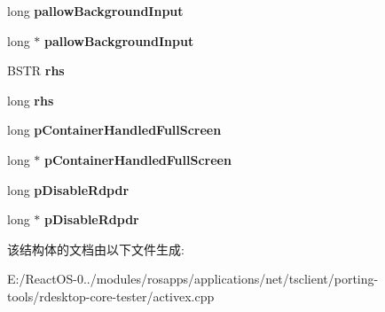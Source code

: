 \begin{DoxyCompactItemize}
long {\bfseries pallow\+Background\+Input}
\item 
\mbox{\label{struct_m_s_t_s_c_lib_1_1_i_ms_tsc_advanced_settings_vtbl_a68d5b0276f4032cbc76793381174ae74}} 
long $\ast$ {\bfseries pallow\+Background\+Input}
\item 
\mbox{\label{struct_m_s_t_s_c_lib_1_1_i_ms_tsc_advanced_settings_vtbl_af50725496eeb79b00284f85da2e7f422}} 
B\+S\+TR {\bfseries rhs}
\item 
\mbox{\label{struct_m_s_t_s_c_lib_1_1_i_ms_tsc_advanced_settings_vtbl_a4514f46936b894fea9758884e503f265}} 
long {\bfseries rhs}
\item 
\mbox{\label{struct_m_s_t_s_c_lib_1_1_i_ms_tsc_advanced_settings_vtbl_a2363cfdc3b819ee7ef66b5ba2632bba5}} 
long {\bfseries p\+Container\+Handled\+Full\+Screen}
\item 
\mbox{\label{struct_m_s_t_s_c_lib_1_1_i_ms_tsc_advanced_settings_vtbl_a430452503b0617b3654bffa58dcfa415}} 
long $\ast$ {\bfseries p\+Container\+Handled\+Full\+Screen}
\item 
\mbox{\label{struct_m_s_t_s_c_lib_1_1_i_ms_tsc_advanced_settings_vtbl_a136fbc6f96753520726f07dec13f43e6}} 
long {\bfseries p\+Disable\+Rdpdr}
\item 
\mbox{\label{struct_m_s_t_s_c_lib_1_1_i_ms_tsc_advanced_settings_vtbl_a29637e7f7e0c8adcb85f1c1fccc38486}} 
long $\ast$ {\bfseries p\+Disable\+Rdpdr}
\end{DoxyCompactItemize}


该结构体的文档由以下文件生成\+:\begin{DoxyCompactItemize}
\item 
E\+:/\+React\+O\+S-\/0../modules/rosapps/applications/net/tsclient/porting-\/tools/rdesktop-\/core-\/tester/activex.\+cpp\end{DoxyCompactItemize}
